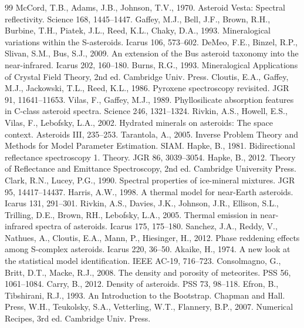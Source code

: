 \documentclass[11pt,a4paper]{article}
\begin{document}
\begin{thebibliography}{99}
 McCord, T.B., Adams, J.B., Johnson, T.V., 1970. Asteroid Vesta: Spectral reflectivity. Science 168, 1445--1447.
 Gaffey, M.J., Bell, J.F., Brown, R.H., Burbine, T.H., Piatek, J.L., Reed, K.L., Chaky, D.A., 1993. Mineralogical variations within the S-asteroids. Icarus 106, 573--602.
 DeMeo, F.E., Binzel, R.P., Slivan, S.M., Bus, S.J., 2009. An extension of the Bus asteroid taxonomy into the near-infrared. Icarus 202, 160--180.
 Burns, R.G., 1993. Mineralogical Applications of Crystal Field Theory, 2nd ed. Cambridge Univ. Press.
 Cloutis, E.A., Gaffey, M.J., Jackowski, T.L., Reed, K.L., 1986. Pyroxene spectroscopy revisited. JGR 91, 11641--11653.
 Vilas, F., Gaffey, M.J., 1989. Phyllosilicate absorption features in C-class asteroid spectra. Science 246, 1321--1324.
 Rivkin, A.S., Howell, E.S., Vilas, F., Lebofsky, L.A., 2002. Hydrated minerals on asteroids: The space context. Asteroids III, 235--253.
 Tarantola, A., 2005. Inverse Problem Theory and Methods for Model Parameter Estimation. SIAM.
 Hapke, B., 1981. Bidirectional reflectance spectroscopy 1. Theory. JGR 86, 3039--3054.
 Hapke, B., 2012. Theory of Reflectance and Emittance Spectroscopy, 2nd ed. Cambridge University Press.
 Clark, R.N., Lucey, P.G., 1990. Spectral properties of ice-mineral mixtures. JGR 95, 14417--14437.
 Harris, A.W., 1998. A thermal model for near-Earth asteroids. Icarus 131, 291--301.
 Rivkin, A.S., Davies, J.K., Johnson, J.R., Ellison, S.L., Trilling, D.E., Brown, RH., Lebofsky, L.A., 2005. Thermal emission in near-infrared spectra of asteroids. Icarus 175, 175--180.
 Sanchez, J.A., Reddy, V., Nathues, A., Cloutis, E.A., Mann, P., Hiesinger, H., 2012. Phase reddening effects among S-complex asteroids. Icarus 220, 36--50.
 Akaike, H., 1974. A new look at the statistical model identification. IEEE AC-19, 716--723.
 Consolmagno, G., Britt, D.T., Macke, R.J., 2008. The density and porosity of meteorites. PSS 56, 1061--1084.
 Carry, B., 2012. Density of asteroids. PSS 73, 98--118.
 Efron, B., Tibshirani, R.J., 1993. An Introduction to the Bootstrap. Chapman and Hall.
 Press, W.H., Teukolsky, S.A., Vetterling, W.T., Flannery, B.P., 2007. Numerical Recipes, 3rd ed. Cambridge Univ. Press.

\end{thebibliography}
\end{document}
